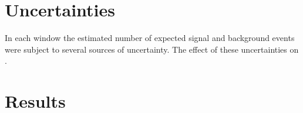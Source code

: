 \section{Uncertainties}
\label{sec:uncertainties}
In each window the estimated number of expected signal and background events were subject to 
several sources of uncertainty.  The effect of these uncertainties on .


\section{Results}
\label{sec:searchResults}

%



